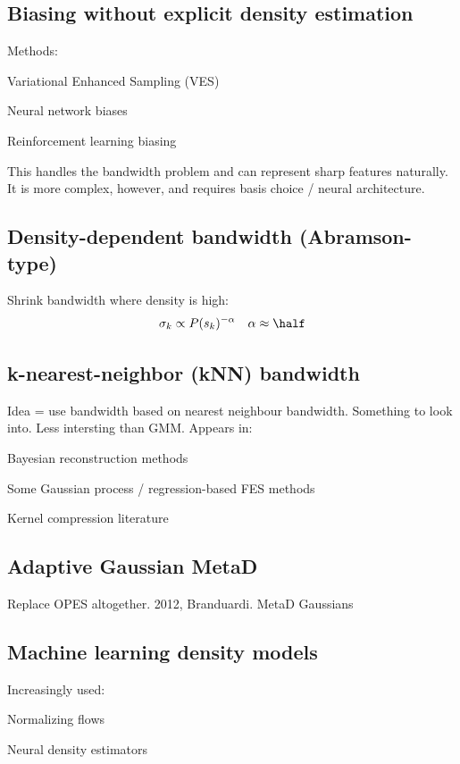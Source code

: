 \subsection{Biasing without explicit density estimation}
Methods:
\begin{itemizec}
    \item Variational Enhanced Sampling (VES)
    \item Neural network biases
    \item Reinforcement learning biasing
\end{itemizec}
This handles the bandwidth problem and can represent sharp features naturally.
It is more complex, however, and requires basis choice / neural architecture.

\subsection{Density-dependent bandwidth (Abramson-type)}
Shrink bandwidth where density is high:
\[
    \sigma_k \propto P(s_k)^{-\alpha} \quad \alpha \approx \half
\]

\subsection{k-nearest-neighbor (kNN) bandwidth}
Idea = use bandwidth based on nearest neighbour bandwidth.  Something to look into.  Less intersting than GMM. Appears in:
\begin{itemizec}
    \item Bayesian reconstruction methods
    \item Some Gaussian process / regression-based FES methods
    \item Kernel compression literature
\end{itemizec}

\subsection{Adaptive Gaussian MetaD}
Replace OPES altogether.  2012, Branduardi.  MetaD Gaussians

\subsection{Machine learning density models}
Increasingly used:
\begin{itemizec}
    \item Normalizing flows
    \item Neural density estimators
\end{itemizec}
